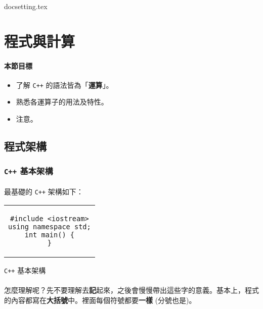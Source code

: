 \documentclass[12pt,a4paper,oneside]{article}
\begin{document}
\begin{CJK}{UTF8}{bkai}

{docsetting.tex}
\setcounter{section}{0}

\fi

\providecommand*\probpath{../uva.data/problem/store/}

\section{程式與計算}

\paragraph{本節目標}
\begin{itemize}
\item 了解 \texttt{C++} 的語法皆為「\textbf{運算}」。
\item 熟悉各運算子的用法及特性。
\item 注意。
\end{itemize}

\subsection{程式架構}
\subsubsection{\texttt{C++} 基本架構}

\paragraph{}最基礎的 \texttt{C++} 架構如下：

\begin{code}[h!]
\centering
\begin{tabular}{c}
\begin{lstlisting}
#include <iostream>
using namespace std;
int main() {
}
\end{lstlisting}
\end{tabular}
\caption{\texttt{C++} 基本架構}
\label{basic:cpp:code:main}
\end{code}

\paragraph{}怎麼理解呢？先不要理解去\textbf{記}起來，之後會慢慢帶出這些字的意義。基本上，程式的內容都寫在\textbf{大括號}中。裡面每個符號都要\textbf{一樣} (分號也是)。

\end{CJK}
\end{document}
